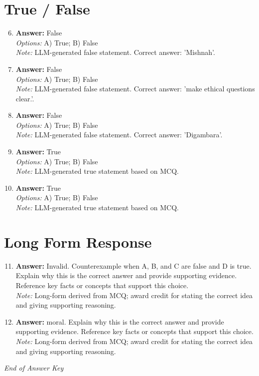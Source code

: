 \documentclass[12pt]{article}
\begin{document}
\section*{True / False}
\begin{enumerate}[label=\arabic*.]
\setcounter{enumi}{5}
\item \textbf{Answer:} False
\\ \textit{Options:} A) True; B) False
\\ \textit{Note:} LLM-generated false statement. Correct answer: 'Mishnah'.
\item \textbf{Answer:} False
\\ \textit{Options:} A) True; B) False
\\ \textit{Note:} LLM-generated false statement. Correct answer: 'make ethical questions clear.'.
\item \textbf{Answer:} False
\\ \textit{Options:} A) True; B) False
\\ \textit{Note:} LLM-generated false statement. Correct answer: 'Digambara'.
\item \textbf{Answer:} True
\\ \textit{Options:} A) True; B) False
\\ \textit{Note:} LLM-generated true statement based on MCQ.
\item \textbf{Answer:} True
\\ \textit{Options:} A) True; B) False
\\ \textit{Note:} LLM-generated true statement based on MCQ.
\end{enumerate}

\section*{Long Form Response}
\begin{enumerate}[label=\arabic*.]
\setcounter{enumi}{10}
\item \textbf{Answer:} Invalid. Counterexample when A, B, and C are false and D is true. Explain why this is the correct answer and provide supporting evidence. Reference key facts or concepts that support this choice.
\\ \textit{Note:} Long-form derived from MCQ; award credit for stating the correct idea and giving supporting reasoning.
\item \textbf{Answer:} moral. Explain why this is the correct answer and provide supporting evidence. Reference key facts or concepts that support this choice.
\\ \textit{Note:} Long-form derived from MCQ; award credit for stating the correct idea and giving supporting reasoning.
\end{enumerate}

\vfill
\noindent\textit{End of Answer Key}
\end{document}
